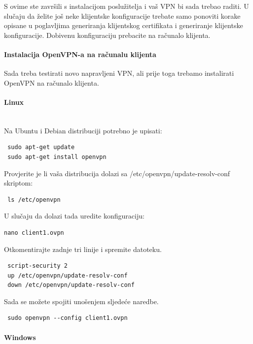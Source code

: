 S ovime ste završili s instalacijom poslužitelja i vaš VPN bi sada trebao raditi. U slučaju da želite još neke klijentske konfiguracije trebate samo ponoviti korake opisane u poglavljima generiranja klijentskog certifikata i generiranje klijentske konfiguracije. Dobivenu konfiguraciju prebacite na računalo klijenta.
\bigbreak
\paragraph*{Instalacija OpenVPN-a na računalu klijenta}
\hfill \smallbreak
Sada treba testirati novo napravljeni VPN, ali prije toga trebamo instalirati OpenVPN na računalo klijenta.
\bigbreak
\paragraph*{Linux}
\hfill \\
Na Ubuntu i Debian distribuciji potrebno je upisati:
\begin{lstlisting}
 sudo apt-get update
 sudo apt-get install openvpn
\end{lstlisting}
Provjerite je li vaša distribucija dolazi sa /etc/openvpn/update-resolv-conf skriptom:
\begin{lstlisting}
 ls /etc/openvpn
\end{lstlisting}
U slučaju da dolazi tada uredite konfiguraciju:
\begin{lstlisting}
nano client1.ovpn
\end{lstlisting}
Otkomentirajte zadnje tri linije i spremite datoteku.
\begin{lstlisting}
 script-security 2
 up /etc/openvpn/update-resolv-conf
 down /etc/openvpn/update-resolv-conf
\end{lstlisting}
Sada se možete spojiti unošenjem sljedeće naredbe.
\begin{lstlisting}
 sudo openvpn --config client1.ovpn
\end{lstlisting}
\bigbreak
\paragraph*{Windows}
\hfill \smallbreak

